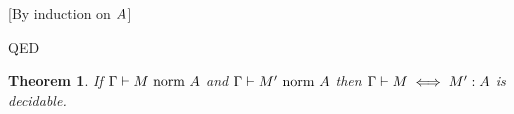 \documentclass{article}
\newtheorem{theorem}{Theorem}
\newcommand{\qed}{\mbox{QED}}
\newenvironment{proof}{\noindent{\bf Proof:}\hspace*{0.5em}}{\hspace*{\fill}\qed}
\theoremstyle{break}
\begin{document}
\begin{proof}[By induction on $A$]
\begin{itemize}
\iffalse

\item Case: $\kind=\ksigma{\cvar}{\kind_1}{\kind_2}$.
\begin{enumerate}
\item If $\semanticvalidtype{\world}{\kind}$ then
$\semanticvalidtype{\world}{\kind_1}$, so by IH(\ref{ih-1}) we
have $\normtype{\world}{\kind_1}$.  By IH(\ref{ih-2}) we know
that $\semanticvalidterm{\world,\cvar{:}{\kind_1}}{\cvar}{\kind_1}$
and hence $\semanticvalidtype{\world,\cvar{:}\kind_1}{\kind_2}$.
Again by IH(\ref{ih-1}) we have
$\normtype{\world,\cvar{:}\kind_1}{\kind_2}$.  Therefore 
$\normtype{\world}{\kind}$.

\item Assume $\reconstruct{\world}{E[\othercvar]}{\kind}$
and $\normE{\world}{E}{\kind}$.  Then
$\reconstruct{\world}{\cpi{1}{E[\othercvar]}}{\kind_1}$,
$\reconstruct{\world}{\cpi{2}{E[\othercvar]}}{\substitute{\cvar}{\cpi{1}{E[\othercvar]}}\kind_2}$,
$\normE{\world}{\cpi{1}{E}}{\kind_1}$, and
$\normE{\world}{\cpi{2}{E}}{\substitute{\cvar}{\cpi{1}{E}}\kind_2}$.
[OOPS...IH DOESN'T QUITE APPLY FOR PI-2 CASE BECAUSE OF HOLE IN TYPE!].
By IH(\ref{ih-2}) we have
$\normterm{\world}{\cpi{1}{E[\othercvar]}}{\kind_1}$ and
$\normterm{\world}{\cpi{2}{E[\othercvar]}}{\substitute{\cvar}{\cpi{1}{E[\othercvar]}}{\kind_2}}$.
Therefore, $\normterm{\world}{E[\othercvar]}{\kind}$.

\item Assume
$\reconstruct{\world}{E[\othercvar]}{\kind}$,
$\reconstruct{\world}{E'[\othercvar]}{\kind'}$,
$\equivkind{\world}{\kind}{\kind'}$,
$\normE{\world}{E}{\kind}$, $\normE{\world}{E'}{\kind'}$,
$\equivconstructor{\world}{E[\othercvar]}{E'[\othercvar]}{\kind}$, and
$\conequiv{\world}{E}{E'}{\kind}$.
The desired conclusion follows from IH(\ref{ih-3}).

\item $\ldots$

\item $\ldots$
\end{enumerate}
\fi
\end{itemize}


\end{proof}


\begin{theorem}
\item If ${\Gamma}\vdash{M}\mbox{\ norm\ }{A}$ and
${\Gamma}\vdash{M'}\mbox{\ norm\ }{A}$ then 
$\Gamma\vdash M \iff M' : A$
is decidable.
\end{theorem}
\end{document}
